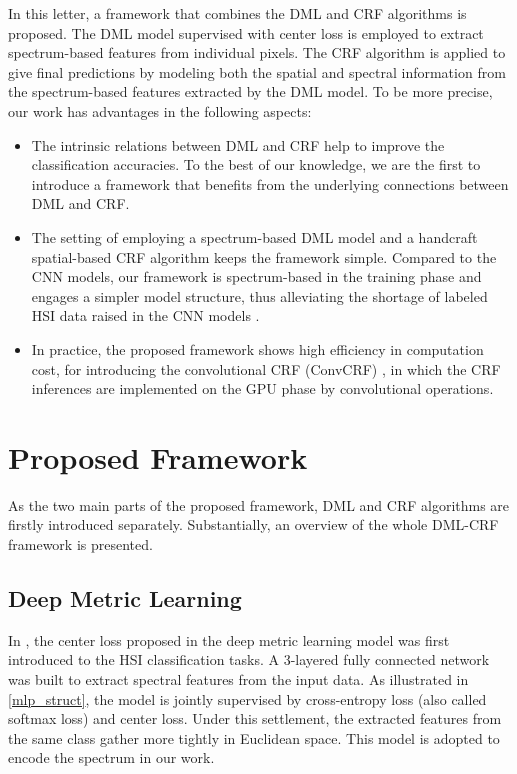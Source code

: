 \documentclass[]{article}
\newcommand{\magentaso}{\color{black}}
\begin{document}
In this letter, a framework that combines the DML and CRF algorithms is proposed.
{\magentaso The DML model supervised with center loss is employed to extract spectrum-based 
	features from individual pixels. The CRF algorithm is applied to give final predictions 
	by modeling both the spatial and spectral information from the spectrum-based features 
	extracted by the DML model.}
To be more precise, our work has advantages in the following aspects:
\begin{itemize}
	\item  The intrinsic relations between DML and CRF help {\magentaso to improve }the classification accuracies.
	To the best of our knowledge, we are the first to introduce a framework that benefits from 
	the underlying connections between DML and CRF.
\item The setting of employing a spectrum-based DML model and a handcraft spatial-based CRF algorithm keeps the framework simple.
	Compared to the CNN models, our framework is spectrum-based in the training phase and engages a simpler model structure, 
	thus alleviating the shortage of labeled HSI data raised in the CNN models \cite{chen2016deep,guo2017spectral}.
\item {\magentaso In practice, the proposed framework shows high efficiency in computation cost, 
	for introducing the convolutional CRF (ConvCRF) \cite{teichmann2018convolutional}, 
    in which the CRF inferences are implemented on the GPU phase by convolutional operations.}
\end{itemize}

\section{Proposed Framework}\label{sec:ProposedModel}
As {\magentaso the }two main parts of the proposed framework, DML and CRF algorithms are firstly introduced separately. Substantially, an overview of the whole DML-CRF framework is presented.
\subsection{Deep Metric Learning} \label{subsec:dml}
In \cite{guo2017spectral}, the center loss proposed in the 
deep metric learning model \cite{wen2016discriminative} 
was first introduced to the HSI classification tasks. A 3-layered fully connected network was built 
to extract spectral features from the input data. {\magentaso As illustrated in \cref{mlp_struct}, 
the model is jointly supervised by cross-entropy loss (also called softmax loss) and center loss. 
Under this settlement, the extracted features from the same class gather more tightly in Euclidean space.}
This model is adopted to encode the spectrum in our work.
\end{document}
